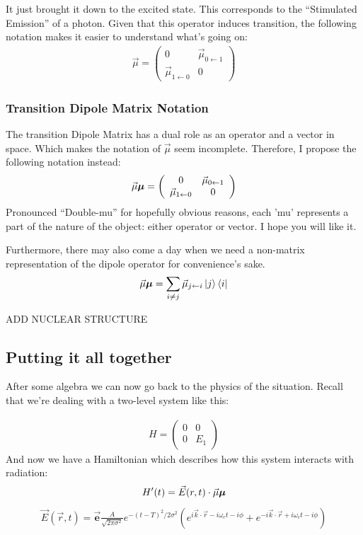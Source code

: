 It just brought it down to the excited state.  This corresponds to the ``Stimulated Emission'' of a photon.  Given that this operator induces transition, the following notation makes it easier to understand what's going on:
\begin{align}
	\vec{\mu} = \left( \begin{array}{ccc}
		0 & \vec{\mu}_{0 \leftarrow 1} \\
		\vec{\mu}_{1 \leftarrow 0} & 0 \end{array} \right)
\end{align}

\subsubsection{Transition Dipole Matrix Notation}
The transition Dipole Matrix has a dual role as an operator and a vector in space.  Which makes the notation of $\vec{\mu}$ seem incomplete.  Therefore, I propose the following notation instead:
\begin{align}
	\vec{\mu} \boldsymbol{\mu} = \left( \begin{array}{ccc}
		0 & \vec{\mu}_{0 \leftarrow 1} \\
		\vec{\mu}_{1 \leftarrow 0} & 0 \end{array} \right)
\end{align}
Pronounced ``Double-mu'' for hopefully obvious reasons, each 'mu' represents a part of the nature of the object: either operator or vector.  I hope you will like it.

Furthermore, there may also come a day when we need a non-matrix representation of the dipole operator for convenience's sake.
\begin{align}
	\vec{\mu} \boldsymbol{\mu} = \sum_{i \neq j} \vec{\mu}_{j \leftarrow i} \ket{j} \bra{i}
\end{align}


ADD NUCLEAR STRUCTURE


\subsection{Putting it all together}
After some algebra we can now go back to the physics of the situation.  Recall that we're dealing with a two-level system like this:

\begin{align}
	H = \left( \begin{array}{ccc}
		0 & 0 \\
		0 & E_1 \end{array} \right)
\end{align}
And now we have a Hamiltonian which describes how this system interacts with radiation:
\begin{align}
	H'(t) = \vec{E}(r, t) \cdot \vec{\mu} \boldsymbol{\mu}
\end{align}
\begin{align}
	\vec{E}(\vec{r}, t) = \vec{\textbf{e}} \frac{A}{\sqrt{2 \pi \sigma^2}} e^{-(t - T)^2 / 2 \sigma^2} \left( e^{i \vec{k} \cdot \vec{r} - i \omega_c t - i \phi}  + e^{-i \vec{k} \cdot \vec{r} + i \omega_c t - i \phi} \right)
\end{align}

